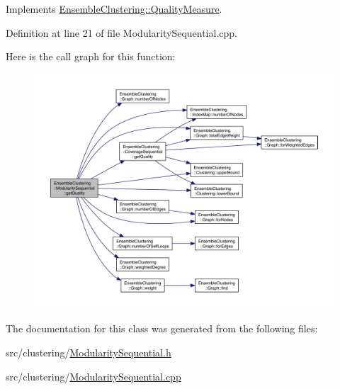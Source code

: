 Implements \hyperlink{class_ensemble_clustering_1_1_quality_measure_aadeac7e03b1fa099669d3b1e93edd1e9}{Ensemble\-Clustering\-::\-Quality\-Measure}.



Definition at line 21 of file Modularity\-Sequential.\-cpp.



Here is the call graph for this function\-:
\nopagebreak
\begin{figure}[H]
\begin{center}
\leavevmode
\includegraphics[width=350pt]{class_ensemble_clustering_1_1_modularity_sequential_a0f3a06d14d94ffd65aa8eed237828650_cgraph}
\end{center}
\end{figure}




The documentation for this class was generated from the following files\-:\begin{DoxyCompactItemize}
\item 
src/clustering/\hyperlink{_modularity_sequential_8h}{Modularity\-Sequential.\-h}\item 
src/clustering/\hyperlink{_modularity_sequential_8cpp}{Modularity\-Sequential.\-cpp}\end{DoxyCompactItemize}

